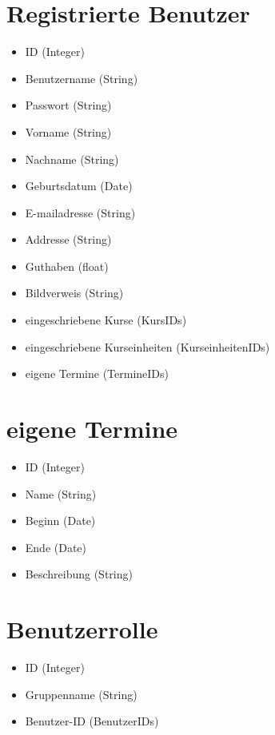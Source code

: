 \documentclass[a4paper]{scrreprt}
\newcounter{Lc}
\newcounter{Hc}
\newcommand{\stepHc}{\stepcounter{Hc}\setcounter{Lc}{0}}
\begin{document}
    \section{Registrierte Benutzer}
		  \Func {} 
		 \begin{itemize}
			\item ID (Integer)
		  	\item Benutzername (String)
		  	\item Passwort (String)
		  	\item Vorname (String)
		  	\item Nachname (String)
		  	\item Geburtsdatum (Date)
		  	\item E-mailadresse (String)
		  	\item Addresse (String)
		  	\item Guthaben (float)
		  	\item Bildverweis (String)
		  	\item eingeschriebene Kurse (KursIDs)
		  	\item eingeschriebene Kurseinheiten (KurseinheitenIDs)
		  	\item eigene Termine (TermineIDs)
		  \end{itemize}

\stepHc		    
	  \section{eigene Termine}
	    \Func {} 
	    \begin{itemize}
	    	\item ID (Integer)
	    	\item Name (String)
	    	\item Beginn (Date)
	    	\item Ende (Date)
	    	\item Beschreibung (String)
	    \end{itemize}
	   
\stepHc	 
	  \section{Benutzerrolle}
	    \Func {} 
	    \begin{itemize}
	    	\item ID (Integer)
	    	\item Gruppenname (String)
	    	\item Benutzer-ID (BenutzerIDs)
	    \end{itemize}
	    
\end{document}
